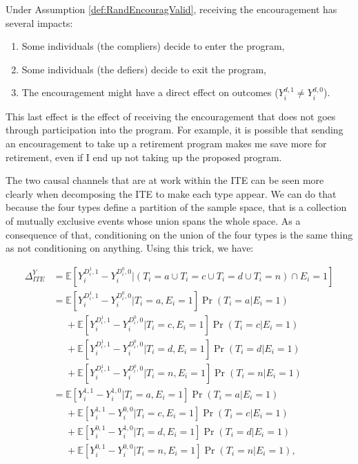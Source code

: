 \documentclass[]{book}
\providecommand{\tightlist}{%
  \setlength{\itemsep}{0pt}\setlength{\parskip}{0pt}}
\newcommand{\esp}[1]{\mathbb{E}[ #1 ]}
\theoremstyle{definition}
\theoremstyle{definition}
\theoremstyle{definition}
\theoremstyle{remark}
\begin{document}
Under Assumption \ref{def:RandEncouragValid}, receiving the encouragement has several impacts:

\begin{enumerate}
\def\labelenumi{\arabic{enumi}.}
\tightlist
\item
  Some individuals (the compliers) decide to enter the program,
\item
  Some individuals (the defiers) decide to exit the program,
\item
  The encouragement might have a direct effect on outcomes (\(Y_i^{d,1}\neq Y_i^{d,0}\)).
\end{enumerate}

This last effect is the effect of receiving the encouragement that does not goes through participation into the program.
For example, it is possible that sending an encouragement to take up a retirement program makes me save more for retirement, even if I end up not taking up the proposed program.

The two causal channels that are at work within the ITE can be seen more clearly when decomposing the ITE to make each type appear.
We can do that because the four types define a partition of the sample space, that is a collection of mutually exclusive events whose union spans the whole space.
As a consequence of that, conditioning on the union of the four types is the same thing as not conditioning on anything.
Using this trick, we have:

\begin{align}
  \Delta^Y_{ITE} & = \esp{Y_i^{D_i^1,1}-Y_i^{D_i^0,0}|(T_i=a\cup T_i=c\cup T_i=d\cup T_i=n)\cap E_i=1}\nonumber\\
                & = \esp{Y_i^{D_i^1,1}-Y_i^{D_i^0,0}|T_i=a,E_i=1}\Pr(T_i=a|E_i=1)\nonumber\\
                & \phantom{=}+ \esp{Y_i^{D_i^1,1}-Y_i^{D_i^0,0}|T_i=c,E_i=1}\Pr(T_i=c|E_i=1)\nonumber\\
                & \phantom{=}+ \esp{Y_i^{D_i^1,1}-Y_i^{D_i^0,0}|T_i=d,E_i=1}\Pr(T_i=d|E_i=1)\nonumber\\
                & \phantom{=}+ \esp{Y_i^{D_i^1,1}-Y_i^{D_i^0,0}|T_i=n,E_i=1}\Pr(T_i=n|E_i=1)\nonumber\\
                & = \esp{Y_i^{1,1}-Y_i^{1,0}|T_i=a,E_i=1}\Pr(T_i=a|E_i=1)\nonumber\\
                & \phantom{=}+ \esp{Y_i^{1,1}-Y_i^{0,0}|T_i=c,E_i=1}\Pr(T_i=c|E_i=1)\nonumber\\
                & \phantom{=}+ \esp{Y_i^{0,1}-Y_i^{1,0}|T_i=d,E_i=1}\Pr(T_i=d|E_i=1)\nonumber\\
                & \phantom{=}+ \esp{Y_i^{0,1}-Y_i^{0,0}|T_i=n,E_i=1}\Pr(T_i=n|E_i=1),\label{eq:ITE3}
\end{align}
\end{document}
